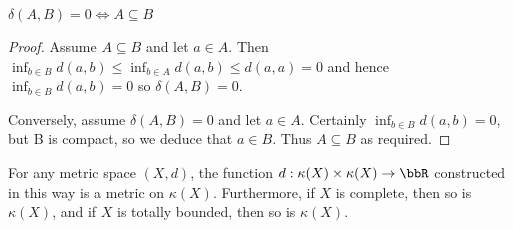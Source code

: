 \documentclass[a4paper,11pt]{article}
\begin{document}
\begin{lemma}
\label{thm:deltaAndInclusion}
$\delta(A,B)=0\iff A\subseteq B$
\end{lemma}

\begin{proof}
Assume $A\subseteq B$ and let $a\in A$.  Then
$\inf_{b\in B}d(a,b)\leq\inf_{b\in A}d(a,b)\leq d(a,a)=0$ and hence $\inf_{b\in
B}d(a,b)=0$ so $\delta(A,B)=0$.

Conversely, assume $\delta(A,B)=0$ and let $a\in A$.  Certainly
$\inf_{b\in B}d(a,b)=0$, but B is compact, so we deduce that $a\in B$.  Thus
$A\subseteq B$ as required.
\end{proof}

\begin{lemma}
\label{thm:spaceOfCompactSubsets}
For any metric space $(X,d)$, the function $d:\kappa(X)\times\kappa(X)\to\bbR$
constructed in this way is a
metric on $\kappa(X)$.  Furthermore, if $X$ is complete, then so is
$\kappa(X)$, and if $X$ is totally bounded, then so is $\kappa(X)$.
\end{lemma}
\end{document}
